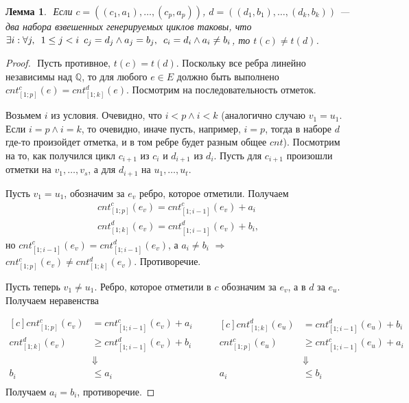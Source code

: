 \documentclass{article}
\newcommand{\squad}{
    \hspace{0.5em}
}
\newtheorem{lemma}{Лемма}
\begin{document}
\begin{lemma} $ $
    \label{lemma:eq}
        Если $c = ((c_{1}, a_{1}), \ldots, (c_{p}, a_{p}))$, $d = ((d_{1}, b_{1}), \ldots, (d_{k}, b_{k}))$ --- два набора взвешенных генерируемых циклов таковы, что $\exists i: \forall j, \squad 1 \leq j < i \squad c_{j} = d_{j} \land a_{j} = b_{j}, \squad c_{i} = d_{i} \land a_{i} \neq b_{i}$, то $t(c) \neq t(d)$.
\end{lemma}
\begin{proof} $ $
    Пусть противное, $t(c) = t(d)$. 
    Поскольку все ребра линейно независимы над $\mathbb{Q}$, то для любого $e \in E$ должно быть выполнено $cnt_{[1;p]}^{c}(e) = cnt_{[1;k]}^{d}(e)$. Посмотрим на последовательность отметок.

    Возьмем $i$ из условия. Очевидно, что $i < p \land i < k$ (аналогично случаю $v_{1} = u_{1}$. Если $i = p \land i = k$, то очевидно, иначе пусть, например, $i = p$, тогда в наборе $d$ где-то произойдет отметка, и в том ребре будет разным общее $cnt$). Посмотрим на то, как получился цикл $c_{i + 1}$ из $c_{i}$ и $d_{i + 1}$
    из $d_{i}$. Пусть для $c_{i + 1}$ произошли отметки на $v_{1}, \ldots, v_{s}$, а для $d_{i + 1}$ на $u_{1}, \ldots, u_{t}$. 

    Пусть $v_{1} = u_{1}$, обозначим за $e_{v}$ ребро, которое отметили. Получаем
    \begin{gather*}
        cnt_{[1;p]}^{c}(e_{v}) = cnt_{[1;i - 1]}^{c}(e_{v}) + a_{i} \\
        cnt_{[1;k]}^{d}(e_{v}) = cnt_{[1;i - 1]}^{d}(e_{v}) + b_{i},
    \end{gather*}
    но $cnt_{[1;i - 1]}^{c}(e_{v}) = cnt_{[1;i - 1]}^{d}(e_{v})$, а $a_{i} \neq b_{i}$ $\Rightarrow$ $cnt_{[1;p]}^{c}(e_{v}) \neq cnt_{[1;k]}^{d}(e_{v})$. Противоречие.

    Пусть теперь $v_{1} \neq u_{1}$. Ребро, которое отметили в $c$ обозначим за $e_{v}$, а в $d$ за $e_{u}$. Получаем неравенства

    \begin{equation*}
        \begin{aligned}[c]
        cnt_{[1;p]}^{c}(e_{v}) &= cnt_{[1;i - 1]}^{c}(e_{v}) + a_{i} \\
        cnt_{[1;k]}^{d}(e_{v}) &\geq cnt_{[1;i - 1]}^{d}(e_{v}) + b_{i} \\
        &\Downarrow \\
        b_{i} &\leq a_{i} \\
        \end{aligned}
        \qquad
        \begin{aligned}[c]
        cnt_{[1;k]}^{d}(e_{u}) &= cnt_{[1;i - 1]}^{d}(e_{u}) + b_{i} \\
        cnt_{[1;p]}^{c}(e_{u}) &\geq cnt_{[1;i - 1]}^{c}(e_{u}) + a_{i} \\
        &\Downarrow \\
        a_{i} &\leq b_{i} \\
        \end{aligned} 
    \end{equation*}
    Получаем $a_{i} = b_{i}$, противоречие.
\end{proof}
\end{document}
